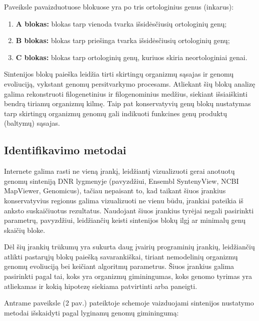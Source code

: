 \documentclass[12pt]{article}
\begin{document}
Paveiksle pavaizduotuose blokuose yra po tris ortologinius genus (inkarus):
\begin{enumerate}
    \item \textbf{A blokas:} blokas tarp vienoda tvarka išsidėsčiusių
          ortologinių genų;
    \item \textbf{B blokas:} blokas tarp priešinga tvarka išsidėsčiusių
          ortologinių genų;
    \item \textbf{C blokas:} blokas tarp ortologinių genų, kuriuos skiria
          neortologiniai genai.
\end{enumerate}

Sintenijos blokų paieška leidžia tirti skirtingų organizmų sąsajas ir genomų
evoliuciją, vykstant genomų persitvarkymo procesams. Atliekant šių blokų analizę
galima rekonstruoti filogenetinius ir filogenominius medžius\cite{PHYLO_REF},
siekiant išsiaiškinti bendrą tiriamų organizmų kilmę. Taip pat konservatyvių
genų blokų nustatymas tarp skirtingų organizmų genomų gali indikuoti funkcines
genų produktų (baltymų) sąsajas\cite{FUNC_REF}.

\newpage

\subsection{Identifikavimo metodai}
Internete galima rasti ne vieną įrankį\cite{ARTICLE3, ARTICLE4}, leidžiantį
vizualizuoti gerai anotuotų genomų sinteniją DNR lygmenyje (pavyzdžiui, Ensembl
SyntenyView\cite{ENS_SYN}, NCBI MapViewer\cite{NCBI_MAP},
Genomicus\cite{GENOMICUS}), tačiau nepaisant to, kad taikant šiuos įrankius
konservatyvius regionus galima vizualizuoti ne vienu būdu, įrankiai pateikia iš
anksto suskaičiuotus rezultatus. Naudojant šiuos įrankius tyrėjai negali
pasirinkti parametrų, pavyzdžiui, leidžiančių keisti sintenijos blokų ilgį ar
minimalų genų skaičių bloke\cite{ARTICLE4}.

Dėl šių įrankių trūkumų yra sukurta daug įvairių programinių įrankių, 
leidžiančių atlikti pastarųjų blokų paiešką savarankiškai, tiriant nemodelinių
organizmų genomų evoliuciją bei keičiant algoritmų parametrus. Šiuos įrankius
galima pasirinkti pagal tai, koks yra organizmų giminingumas, koks genomo
tyrimas yra atliekamas ir kokią hipotezę siekiama patvirtinti arba paneigti.

Antrame paveiksle (2 pav.) pateiktoje schemoje vaizduojami sintenijos nustatymo
metodai išskaidyti pagal lyginamų genomų giminingumą:
\end{document}
